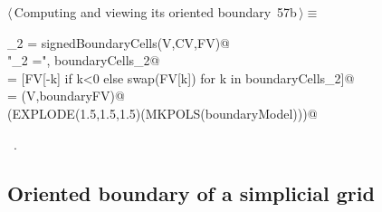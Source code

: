 \documentclass[11pt,oneside]{article}	%
\begin{document}
\begin{flushleft} \small \label{scrap104}
\protect{}$\langle\,$Computing and viewing its oriented boundary\nobreak\ {\footnotesize 57b}$\,\rangle\equiv$
\vspace{-1ex}
\begin{list}{}{} \item
\mbox{}\verb@boundaryCells_2 = signedBoundaryCells(V,CV,FV)@\\
\mbox{}\verb@print "\nboundaryCells_2 =\n", boundaryCells_2@\\
\mbox{}\verb@boundaryFV = [FV[-k] if k<0 else swap(FV[k]) for k in boundaryCells_2]@\\
\mbox{}\verb@boundaryModel = (V,boundaryFV)@\\
\mbox{}\verb@VIEW(EXPLODE(1.5,1.5,1.5)(MKPOLS(boundaryModel)))@\\
\mbox{}\verb@@{\NWsep}
\end{list}
\vspace{-1ex}
\footnotesize\addtolength{\baselineskip}{-1ex}
\begin{list}{}{\setlength{\itemsep}{-\parsep}\setlength{\itemindent}{-\leftmargin}}
\item \NWtxtMacroRefIn\ .
\end{list}
\end{flushleft}

\subsection{Oriented boundary of a simplicial grid}
\end{document}
